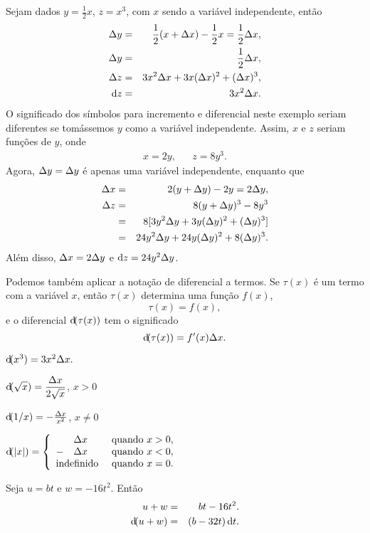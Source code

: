 \begin{example}
Sejam dados $y = \frac{1}{2}x$, $z = x^3$, com $x$ sendo a variável
independente, então
\begin{eqnarray*}
  \Dy & = & \frac{1}{2}(x + \Dx) - \frac{1}{2}x = \frac{1}{2}\Dx, \\
  \dy & = & \frac{1}{2}\dx, \\
  \Dz & = & 3x^2\Dx + 3x(\Dx)^2 + (\Dx)^3, \\
  \dz & = & 3x^2 \dx. 
\end{eqnarray*}
O significado dos símbolos para incremento e diferencial neste exemplo
seriam diferentes se tomássemos $y$ como a variável independente. Assim,
$x$ e $z$ seriam funções de $y$, onde
\begin{eqnarray*}
  x = 2y, &  & z = 8y^3.
\end{eqnarray*}
Agora, $\Delta y = \Delta{y}$ é apenas uma variável independente, enquanto que
\begin{eqnarray*}
  \Delta x & = & 2(y + \Delta y) - 2y = 2\Delta y, \\
  \Delta z & = & 8(y+\Delta y)^3 - 8y^3 \\
      & = & 8[3y^2 \Delta y + 3y(\Delta y)^2 + (\Delta y)^3] \\
      & = & 24y^2 \Delta y + 24y(\Delta y)^2 + 8(\Delta y)^3.
\end{eqnarray*}
Além disso, $\Delta{x} = 2\Delta{y}$ \; e \; $\dz = 24y^2\dy$.
\end{example}

Podemos também aplicar a notação de diferencial a termos. Se $\tau(x)$ é
um termo com a variável $x$, então $\tau(x)$ determina uma função $f(x)$,
$$
  \tau(x) = f(x),
$$
e o diferencial $\dif(\tau(x))$ tem o significado
$$
  \dif(\tau(x)) = f'(x) \dx.
$$

\begin{example}
\par\indent
\begin{enumeratewithspaces}[(a)]
\item $\dif(x^3) = 3x^2 \dx.$
\item $\displaystyle \dif(\sqrt{x}) = \frac{\dx}{2\sqrt{x}}$, \hspace{1.5em} $x > 0$
\item $\dif(1/x) = -\frac{\dx}{x^2}$, \hspace{1.5em} $x \ne 0$
\item $\dif(|x|) = \left\{ \begin{array}{rll}
                       & \dx & \text{ quando } x > 0, \\
                     - & \dx & \text{ quando } x < 0, \\
                     \multicolumn{2}{l}{\text{indefinido}} &
                       \text{ quando } x = 0.
                   \end{array} \right.$
\item Seja $u = bt$ e $w = -16t^2$. Então
\begin{eqnarray*}
  u + w & = & bt - 16t^2. \\
  \dif(u + w) & = & (b - 32t)\dif t.
\end{eqnarray*}
\end{enumeratewithspaces}
\end{example}

